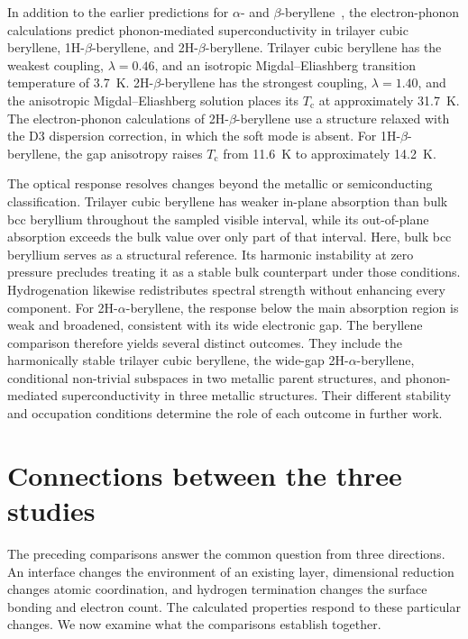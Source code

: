 In addition to the earlier predictions for $\alpha$- and $\beta$-beryllene~\cite{li2023coexistence}, the electron-phonon calculations predict phonon-mediated superconductivity in trilayer cubic beryllene, 1H-$\beta$-beryllene, and 2H-$\beta$-beryllene.
Trilayer cubic beryllene has the weakest coupling, $\lambda=0.46$, and an isotropic Migdal--Eliashberg transition temperature of \qty{3.7}{\kelvin}.
2H-$\beta$-beryllene has the strongest coupling, $\lambda=1.40$, and the anisotropic Migdal--Eliashberg solution places its $T_{\mathrm{c}}$ at approximately \qty{31.7}{\kelvin}.
The electron-phonon calculations of 2H-$\beta$-beryllene use a structure relaxed with the D3 dispersion correction, in which the soft mode is absent.
For 1H-$\beta$-beryllene, the gap anisotropy raises $T_{\mathrm{c}}$ from \qty{11.6}{\kelvin} to approximately \qty{14.2}{\kelvin}.

The optical response resolves changes beyond the metallic or semiconducting classification.
Trilayer cubic beryllene has weaker in-plane absorption than bulk bcc beryllium throughout the sampled visible interval,
while its out-of-plane absorption exceeds the bulk value over only part of that interval.
Here, bulk bcc beryllium serves as a structural reference.
Its harmonic instability at zero pressure precludes treating it as a stable bulk counterpart under those conditions.
Hydrogenation likewise redistributes spectral strength without enhancing every component.
For 2H-$\alpha$-beryllene, the response below the main absorption region is weak and broadened, consistent with its wide electronic gap.
The beryllene comparison therefore yields several distinct outcomes.
They include the harmonically stable trilayer cubic beryllene, the wide-gap 2H-$\alpha$-beryllene, conditional non-trivial subspaces in two metallic parent structures, and phonon-mediated superconductivity in three metallic structures.
Their different stability and occupation conditions determine the role of each outcome in further work.

\section{Connections between the three studies}
\label{sec:conclusions_connections}

The preceding comparisons answer the common question from three directions.
An interface changes the environment of an existing layer, dimensional reduction changes atomic coordination, and hydrogen termination changes the surface bonding and electron count.
The calculated properties respond to these particular changes.
We now examine what the comparisons establish together.

